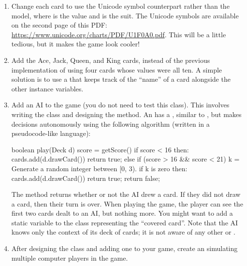 \begin{enumerate}[label=(\alph*)]
    \item Change each card to use the Unicode symbol counterpart rather than the   model, where  is the value and  is the suit. The Unicode symbols are available on the second page of this PDF: \url{https://www.unicode.org/charts/PDF/U1F0A0.pdf}. This will be a little tedious, but it makes the game look cooler!
    \item Add the Ace, Jack, Queen, and King cards, instead of the previous implementation of using four cards whose values were all ten. A simple solution is to use a  that keeps track of the ``name'' of a card alongside the other instance variables. 
    \item Add an AI to the game (you do not need to test this class). This involves writing the  class and designing the  method. An  has a , similar to , but makes decisions autonomously using the following algorithm (written in a pseudocode-like language):
    \begin{verbnobox}[\small]
boolean play(Deck d) {
  score = getScore()
  if score < 16 then:
    cards.add(d.drawCard())
    return true;
  else if (score > 16 && score < 21) {
    k = Generate a random integer between [0, 3).
    if k is zero then:
      cards.add(d.drawCard())
      return true;
  } 
  return false;
}
\end{verbnobox}
The method returns whether or not the AI drew a card. If they did not draw a card, then their turn is over. When playing the game, the player can see the first two cards dealt to an AI, but nothing more. You might want to add a static variable to the  class representing the ``covered card''. Note that the AI knows only the context of its deck of cards; it is not aware of any other  or .
\item After designing the  class and adding one to your game, create an  simulating multiple computer players in the game.
\end{enumerate}



